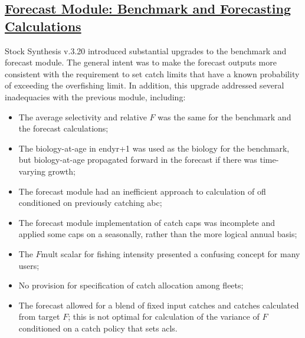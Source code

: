 \hypertarget{appendB}{}
\subsection[Forecast Module: Benchmark and Forecasting Calculations]{\protect\hyperlink{appendB}{Forecast Module: Benchmark and Forecasting Calculations}}\label{sec:forecast}

Stock Synthesis v.3.20 introduced substantial upgrades to the benchmark and forecast module. The general intent was to make the forecast outputs more consistent with the requirement to set catch limits that have a known probability of exceeding the overfishing limit. In addition, this upgrade addressed several inadequacies with the previous module, including:

\begin{itemize}
	\item The average selectivity and relative $F$ was the same for the benchmark and the forecast calculations;
	\item The biology-at-age in endyr+1 was used as the biology for the benchmark, but biology-at-age propagated forward in the forecast if there was time-varying growth;
	\item The forecast module had an inefficient approach to calculation of \gls{ofl} conditioned on previously catching \gls{abc};
	\item The forecast module implementation of catch caps was incomplete and applied some caps on a seasonally, rather than the more logical annual basis;
	\item The $F\text{mult}$ scalar for fishing intensity presented a confusing concept for many users;
	\item No provision for specification of catch allocation among fleets;
	\item The forecast allowed for a blend of fixed input catches and catches calculated from target $F$; this is not optimal for calculation of the variance of $F$ conditioned on a catch policy that sets \glspl{acl}.
\end{itemize}

